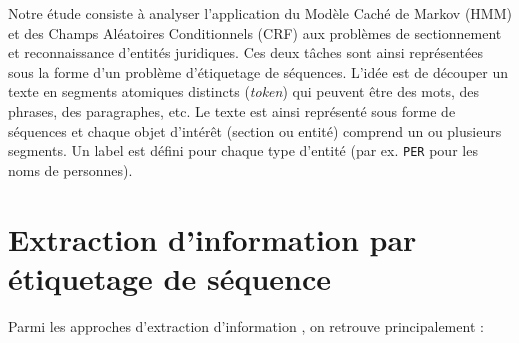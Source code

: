 Notre étude consiste à analyser l'application du Modèle Caché de Markov (HMM) et des Champs Aléatoires Conditionnels (CRF) aux problèmes de sectionnement et reconnaissance d'entités juridiques. Ces deux tâches sont ainsi représentées sous la forme d'un problème d'étiquetage de séquences. L'idée est de découper un texte en segments atomiques distincts (\textit{token}) qui peuvent être des mots, des phrases, des paragraphes, etc. Le texte est ainsi représenté sous forme de séquences et chaque objet d'intérêt (section ou entité) comprend  un ou plusieurs segments. Un label est défini pour chaque type d'entité (par ex. \verb|PER| pour les noms de personnes). 


\section{Extraction d'information par étiquetage de séquence}
\label{sec:structuration:biblio}

Parmi les approches d'extraction d'information \citet{chau2002nerwithNN}, on retrouve principalement :

